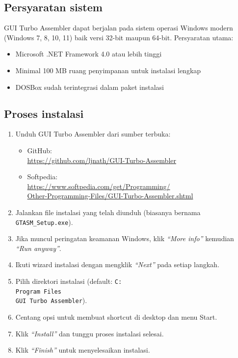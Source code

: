 \documentclass[../main.tex]{subfiles}
\begin{document}
        \subsection{Persyaratan sistem}
            GUI Turbo Assembler dapat berjalan pada sistem operasi Windows modern (Windows 7, 8, 10, 11) baik versi 32-bit maupun 64-bit. Persyaratan utama:
            \begin{itemize}
\item Microsoft .NET Framework 4.0 atau lebih tinggi
\item Minimal 100 MB ruang penyimpanan untuk instalasi lengkap
\item DOSBox sudah terintegrasi dalam paket instalasi
            \end{itemize}

        \subsection{Proses instalasi}
            \begin{enumerate}
\item Unduh GUI Turbo Assembler dari sumber terbuka:
\begin{itemize}
    \item GitHub: \\
    \url{https://github.com/ljnath/GUI-Turbo-Assembler}
    \item Softpedia: \\
    \url{https://www.softpedia.com/get/Programming/} \\
    \url{Other-Programming-Files/GUI-Turbo-Assembler.shtml}
\end{itemize}
\item Jalankan file instalasi yang telah diunduh (biasanya bernama \texttt{GTASM\_Setup.exe}).
\item Jika muncul peringatan keamanan Windows, klik \textit{``More info''} kemudian \textit{``Run anyway''}.
\item Ikuti wizard instalasi dengan mengklik \textit{``Next''} pada setiap langkah.
\item Pilih direktori instalasi (default: \texttt{C:\\Program Files\\GUI Turbo Assembler}).
\item Centang opsi untuk membuat shortcut di desktop dan menu Start.
\item Klik \textit{``Install''} dan tunggu proses instalasi selesai.
\item Klik \textit{``Finish''} untuk menyelesaikan instalasi.
            \end{enumerate}
\end{document}
